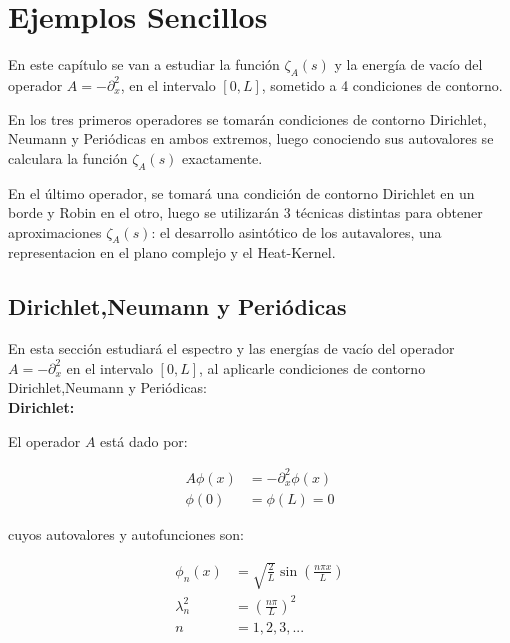 \chapter{Ejemplos Sencillos}

En este capítulo se van a estudiar la función $\zeta _A (s)$ y la energía de vacío del operador $A = - \partial ^2 _x$, en el intervalo $[0,L]$, sometido a 4 condiciones de contorno. 

En los tres primeros operadores se tomarán condiciones de contorno Dirichlet, Neumann y Periódicas en ambos extremos, luego conociendo sus autovalores  se calculara la función $ \zeta _A (s) $ exactamente. 

En el último operador, se tomará una condición de contorno Dirichlet en un borde y Robin en el otro, luego se utilizarán 3 técnicas distintas para obtener aproximaciones $\zeta _A (s)$: el desarrollo asintótico de los autavalores, una representacion en el plano complejo  y el Heat-Kernel.

\section{Dirichlet,Neumann y Periódicas}

En esta sección estudiará el espectro y las energías de vacío del operador $A = - \partial ^2 _x$ en el intervalo $[0,L]$, al aplicarle condiciones de contorno Dirichlet,Neumann y Periódicas:\\

\textbf{Dirichlet:}


El operador $A$ está dado por:

\begin{equation}
\begin{aligned}
	A \phi (x) &= - \partial _x ^2 \phi (x) \\[10pt]
    \phi (0) &= \phi(L) = 0 
\end{aligned}
\end{equation}



cuyos autovalores y autofunciones son: 

\begin{equation}
\begin{aligned}
	\phi _n (x) &= \sqrt{\frac{2}{L}} \sin( \frac{n \pi x}{L} ) \\[10pt]
	\lambda _n ^2 &= \left( \frac{n \pi }{L} \right) ^2 \\[10pt]
	n &= 1,2,3, ...
\end{aligned}
\end{equation}

